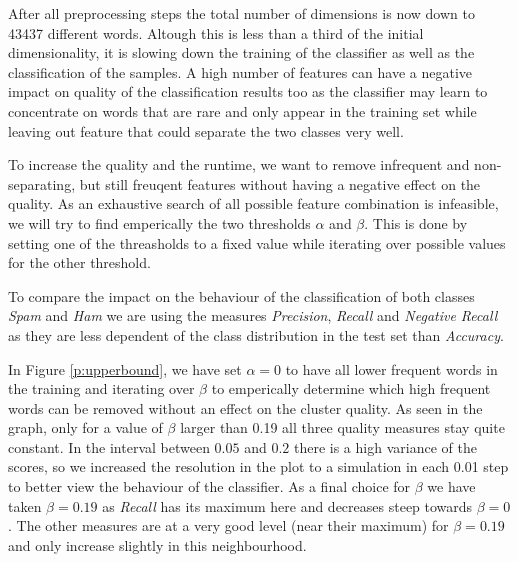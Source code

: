 After all preprocessing steps the total number of dimensions is now down to 43437 different words.
Altough this is less than a third of the initial dimensionality, it is slowing down the training of the classifier as well as the classification of the samples.
A high number of features can have a negative impact on quality of the classification results too as the classifier may learn to concentrate on words that are rare and only appear in the training set while leaving out feature that could separate the two classes very well.

To increase the quality and the runtime, we want to remove infrequent and non-separating, but still freuqent features without having a negative effect on the quality.
As an exhaustive search of all possible feature combination is infeasible, we will try to find emperically the two thresholds $\alpha$ and $\beta$.
This is done by setting one of the threasholds to a fixed value while iterating over possible values for the other threshold.



To compare the impact on the behaviour of the classification of both classes \emph{Spam} and \emph{Ham} we are using the measures \emph{Precision}, \emph{Recall} and \emph{Negative Recall} as they are less dependent of the class distribution in the test set than \emph{Accuracy}.

In Figure \ref{p:upperbound}, we have set $\alpha = 0$ to have all lower frequent words in the training and iterating over $\beta$ to emperically determine which high frequent words can be removed without an effect on the cluster quality.
As seen in the graph, only for a value of $\beta$ larger than 0.19 all three quality measures stay quite constant.
In the interval between $0.05$ and $0.2$ there is a high variance of the scores, so we increased the resolution in the plot to a simulation in each 0.01 step to better view the behaviour of the classifier.
As a final choice for $\beta$ we have taken $\beta = 0.19$ as \emph{Recall} has its maximum here and decreases steep towards $\beta = 0$.
The other measures are at a very good level (near their maximum) for $\beta = 0.19$ and only increase slightly in this neighbourhood.



